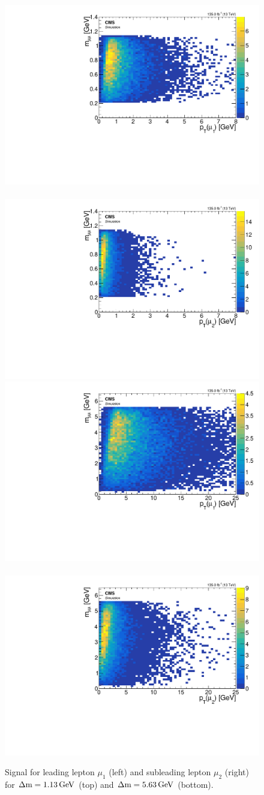 \begin{figure}[h]
\centering
\includegraphics[width=0.48\linewidth]{plots/signal_muons_gen_delta_r_vs_pt/none_gen_invmass_vs_pt_1.pdf} \,
\includegraphics[width=0.48\linewidth]{plots/signal_muons_gen_delta_r_vs_pt/none_gen_invmass_vs_pt_2.pdf}  \\
\includegraphics[width=0.48\linewidth]{plots/signal_muons_gen_delta_r_vs_pt_dm5/none_gen_invmass_vs_pt_1.pdf} \,
\includegraphics[width=0.48\linewidth]{plots/signal_muons_gen_delta_r_vs_pt_dm5/none_gen_invmass_vs_pt_2.pdf}  \\
\caption[Signal \mmumu \vs \pt]{ Signal \mmumu \vs \pt for leading lepton $\mu_1$ (left) and subleading lepton $\mu_2$ (right) for $\Delta\mathrm{m}=1.13\,\text{Ge\hspace{-.08em}V}$ (top) and $\Delta\mathrm{m}=5.63\,\text{Ge\hspace{-.08em}V}$ (bottom).}
\label{fig:signal-gen-invamass-pt}
\end{figure}

